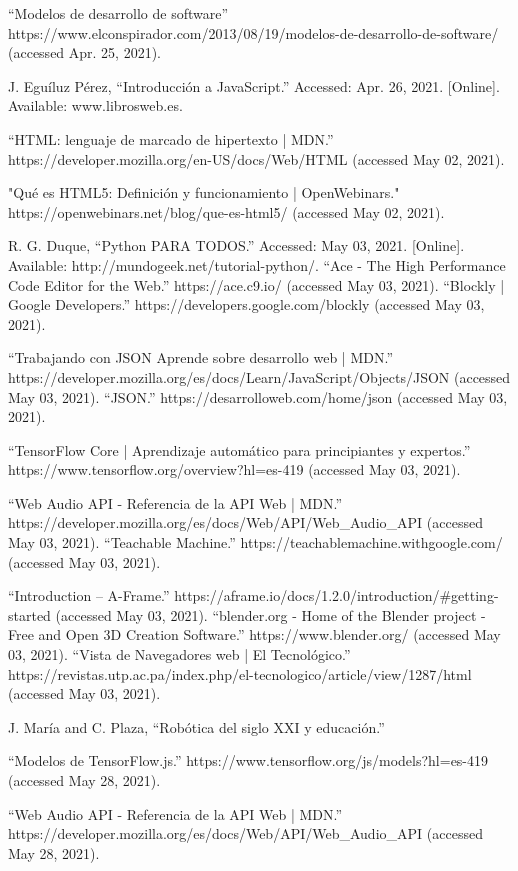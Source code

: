 \begin{thebibliography}{69}
“Modelos de desarrollo de software” https://www.elconspirador.com/2013/08/19/modelos-de-desarrollo-de-software/ (accessed Apr. 25, 2021).

 J. Eguíluz Pérez, “Introducción a JavaScript.” Accessed: Apr. 26, 2021. [Online]. Available: www.librosweb.es.


	“HTML: lenguaje de marcado de hipertexto | MDN.” https://developer.mozilla.org/en-US/docs/Web/HTML (accessed May 02, 2021).

"Qué es HTML5: Definición y funcionamiento | OpenWebinars." https://openwebinars.net/blog/que-es-html5/ (accessed May 02, 2021).


 R. G. Duque, “Python PARA TODOS.” Accessed: May 03, 2021. [Online]. Available: http://mundogeek.net/tutorial-python/.
 “Ace - The High Performance Code Editor for the Web.” https://ace.c9.io/ (accessed May 03, 2021).
 “Blockly  |  Google Developers.” https://developers.google.com/blockly (accessed May 03, 2021).




 “Trabajando con JSON \- Aprende sobre desarrollo web | MDN.” https://developer.mozilla.org/es/docs/Learn/JavaScript/Objects/JSON (accessed May 03, 2021).
“JSON.” https://desarrolloweb.com/home/json (accessed May 03, 2021).

 “TensorFlow Core | Aprendizaje automático para principiantes y expertos.” https://www.tensorflow.org/overview?hl=es-419 (accessed May 03, 2021).

“Web Audio API - Referencia de la API Web | MDN.” https://developer.mozilla.org/es/docs/Web/API/Web\_Audio\_API (accessed May 03, 2021).
“Teachable Machine.” https://teachablemachine.withgoogle.com/ (accessed May 03, 2021).

 “Introduction – A-Frame.” https://aframe.io/docs/1.2.0/introduction/\#getting-started (accessed May 03, 2021).
 “blender.org - Home of the Blender project - Free and Open 3D Creation Software.” https://www.blender.org/ (accessed May 03, 2021).
 “Vista de Navegadores web | El Tecnológico.” https://revistas.utp.ac.pa/index.php/el-tecnologico/article/view/1287/html (accessed May 03, 2021).

 J. María and C. Plaza, “Robótica del siglo XXI y educación.”

 “Modelos de TensorFlow.js.” https://www.tensorflow.org/js/models?hl=es-419 (accessed May 28, 2021).

 “Web Audio API - Referencia de la API Web | MDN.” https://developer.mozilla.org/es/docs/Web/API/Web\_Audio\_API (accessed May 28, 2021).

\end{thebibliography}
